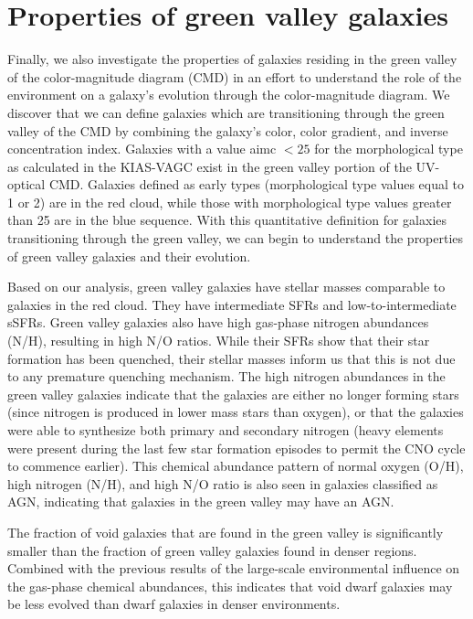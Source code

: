 \section[GV galaxies]{Properties of green valley galaxies}
Finally, we also investigate the properties of galaxies residing in the green 
valley of the color-magnitude diagram (CMD) in an effort to understand the role 
of the environment on a galaxy's evolution through the color-magnitude diagram.  
We discover that we can define galaxies which are transitioning through the 
green valley of the CMD by combining the galaxy's color, color gradient, and 
inverse concentration index.  Galaxies with a value aimc $< 25$ for the 
morphological type as calculated in the KIAS-VAGC exist in the green valley 
portion of the UV-optical CMD.  Galaxies defined as early types (morphological 
type values equal to 1 or 2) are in the red cloud, while those with 
morphological type values greater than 25 are in the blue sequence.  With this 
quantitative definition for galaxies transitioning through the green valley, we 
can begin to understand the properties of green valley galaxies and their 
evolution.

Based on our analysis, green valley galaxies have stellar masses comparable to 
galaxies in the red cloud.  They have intermediate SFRs and low-to-intermediate 
sSFRs.  Green valley galaxies also have high gas-phase nitrogen abundances 
(N/H), resulting in high N/O ratios.  While their SFRs show that their star 
formation has been quenched, their stellar masses inform us that this is not due 
to any premature quenching mechanism.  The high nitrogen abundances in the green 
valley galaxies indicate that the galaxies are either no longer forming stars 
(since nitrogen is produced in lower mass stars than oxygen), or that the 
galaxies were able to synthesize both primary and secondary nitrogen (heavy 
elements were present during the last few star formation episodes to permit the 
CNO cycle to commence earlier).  This chemical abundance pattern of normal 
oxygen (O/H), high nitrogen (N/H), and high N/O ratio is also seen in galaxies 
classified as AGN, indicating that galaxies in the green valley may have an AGN.

The fraction of void galaxies that are found in the green valley is 
significantly smaller than the fraction of green valley galaxies found in denser 
regions.  Combined with the previous results of the large-scale environmental 
influence on the gas-phase chemical abundances, this indicates that void dwarf 
galaxies may be less evolved than dwarf galaxies in denser environments.


